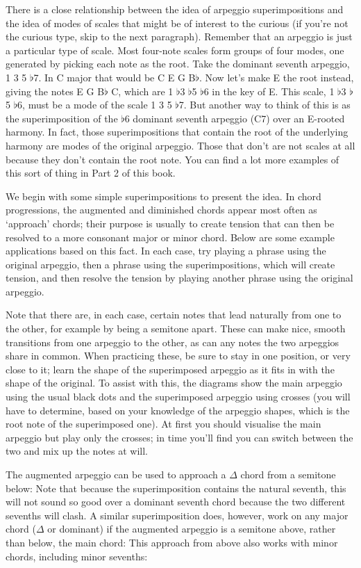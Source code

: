 \documentclass[english]{./gbook}
\begin{document}
\begin{large}
There is a close relationship between the idea of arpeggio superimpositions and the idea of modes of scales that might be of interest to the curious (if you're not the curious type, skip to the next paragraph). Remember that an arpeggio is just a particular type of scale. Most four-note scales form groups of four modes, one generated by picking each note as the root. Take the dominant seventh arpeggio, 1 3 5 $\flat$7. In C major that would be C E G B$\flat$. Now let's make E the root instead, giving the notes E G B$\flat$ C, which are 1 $\flat$3 $\flat$5 $\flat$6 in the key of E. This scale, 1 $\flat$3 $\flat$5 $\flat$6, must be a mode of the scale 1 3 5 $\flat$7. But another way to think of this is as the superimposition of the $\flat$6 dominant seventh arpeggio (C7) over an E-rooted harmony. In fact, those superimpositions that contain the root of the underlying harmony are modes of the original arpeggio. Those that don't are not scales at all because they don't contain the root note. You can find a lot more examples of this sort of thing in Part 2 of this book.

We begin with some simple superimpositions to present the idea. In chord progressions, the augmented and diminished chords appear most often as `approach' chords; their purpose is usually to create tension that can then be resolved to a more consonant major or minor chord. Below are some example applications based on this fact. In each case, try playing a phrase using the original arpeggio, then a phrase using the superimpositions, which will create tension, and then resolve the tension by playing another phrase using the original arpeggio. 

Note that there are, in each case, certain notes that lead naturally from one to the other, for example by being a semitone apart. These can make nice, smooth transitions from one arpeggio to the other, as can any notes the two arpeggios share in common. When practicing these, be sure to stay in one position, or very close to it; learn the shape of the superimposed arpeggio as it fits in with the shape of the original. To assist with this, the diagrams show the main arpeggio using the usual black dots and the superimposed arpeggio using crosses (you will have to determine, based on your knowledge of the arpeggio shapes, which is the root note of the superimposed one). At first you should visualise the main arpeggio but play only the crosses; in time you'll find you can switch between the two and mix up the notes at will.

The augmented arpeggio can be used to approach a $\Delta$ chord from a semitone below:
Note that because the superimposition contains the natural seventh, this will not sound so good over a dominant seventh chord because the two different sevenths will clash. A similar superimposition does, however, work on any major chord ($\Delta$ or dominant) if the augmented arpeggio is a semitone above, rather than below, the main chord:
This approach from above also works with minor chords, including minor sevenths:


\end{large}
\end{document}
